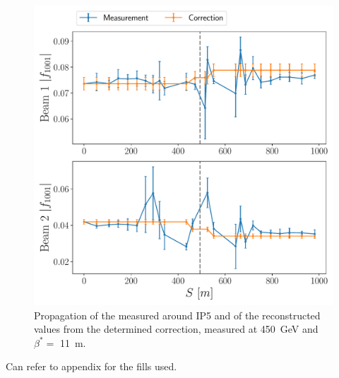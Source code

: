 \begin{figure}[!htb]
    \centering
    \includegraphics*[width=\columnwidth]{Figures/Chapter6/beamtest_sbs_abs_f1001_ip5.pdf}
    \caption{Propagation of the measured \absfoneohone around IP5 and of the reconstructed values from the determined correction, measured at \qty{450}{\giga\electronvolt} and \(\beta^{*}=\) \qty{11}{\meter}.}
    \label{fig:beamtest_sbs_abs_f1001_ip5}
\end{figure}

Can refer to appendix  for the fills used.

